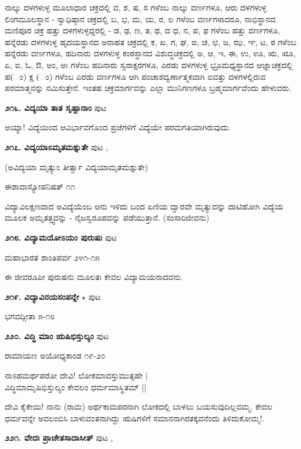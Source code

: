 ನಾಲ್ಕು ದಳಗಳುಳ್ಳ ಮೂಲಾಧಾರ ಚಕ್ರದಲ್ಲಿ ವ, ಶ, ಷ, ಸ ಗಳೆಂಬ ನಾಲ್ಕು ವರ್ಣಗಳೂ,  ಆರು ದಳಗಳುಳ್ಳ ಲಿಂಗಮೂಲಸ್ಥಾನ - ಸ್ವಾಧಿಷ್ಠಾನ ಚಕ್ರದಲ್ಲಿ ಬ, ಭ, ಮ, ಯ, ರ, ಲ ಗಳೆಂಬ ವರ್ಣಗಳಾದರೂ, ನಾಭಿಸ್ಥಾನದ ಮಣಿಪೂರ ಚಕ್ರ ಹತ್ತು ದಳಗಳುಳ್ಳದ್ದರಲ್ಲಿ - ಡ, ಢ, ಣ, ತ, ಥ, ದ ಧ, ನ, ಪ, ಫ ಗಳೆಂಬ ಹತ್ತು ವರ್ಣಗಳೂ, ಹನ್ನೆರಡು ದಳಗಳುಳ್ಳ ಹೃದಯಸ್ಥಾನದ ಅನಾಹತ ಚಕ್ರದಲ್ಲಿ ಕ, ಖ, ಗ, ಘ, ಙ, ಚ, ಛ, ಜ, ಝ, ಞ, ಟ, ಠ ಗಳೆಂಬ ಹನ್ನೆರಡು ವರ್ಣಗಳೂ, ಹದಿನಾರು ದಳಗಳುಳ್ಳ ಕಂಠಸ್ಥಾನದ ವಿಶುದ್ಧಚಕ್ರದಲ್ಲಿ ಅ, ಆ, ಇ, ಈ, ಉ, ಊ, ಋ, ೠ, ಏ, ಐ, ಓ, ಔ, ಅಂ, ಅಃ ಗಳೆಂಬ ಹದಿನಾರು ಸ್ವರಾಕ್ಷರಗಳೂ, ಎರಡು ದಳಗಳುಳ್ಳ ಭ್ರೂಮಧ್ಯಸ್ಥಾನದ ಆಜ್ಞಾಚಕ್ರದಲ್ಲಿ ಹ(ಂ) ಕ್ಷ (ಂ) ಗಳೆಂಬ ಎರಡು ವರ್ಣಗಳೂ ಆಗಿ ಪಂಚಾಶದ್ವರ್ಣಾತ್ಮಕವಾಗಿ ಐವತ್ತು ದಳಗಳಲ್ಲಿರುವ ಪರಮಾತ್ಮನನ್ನು ನಮಿಸುತ್ತೇನೆ. ಇಂತಹ ಚಕ್ರಮಾರ್ಗವನ್ನು ಎಲ್ಲಾ ಮುನಿಗಣಗಳೂ ಬ್ರಹ್ಮಮಾರ್ಗವೆಂದು ಹೇಳುವರು.

\medskip
\noindent\textbf{೨೧೬. ವಿದ್ಯಯಾ ತಾತ ಸೃಷ್ಟಾನಾಂ} \hfill ಪುಟ \pageref{133}

ಅಯ್ಯಾ! ವಿದ್ಯೆಯಿಂದ ಆವಿರ್ಭಾವಗೊಂದ ಪ್ರಜೆಗಳಿಗೆ ವಿದ್ಯೆಯೇ ಪರಮಗತಿಯಾಗಿರುವುದು.

\medskip
\noindent\textbf{೨೧೭. ವಿದ್ಯಯಾಽಮೃತಮಶ್ನುತೇ} \hfill ಪುಟ \pageref{99},\pageref{133a}

(ಅವಿದ್ಯಯಾ ಮೃತ್ಯುಂ ತೀರ್ತ್ವಾ ವಿದ್ಯಯಾಮೃತಮಶ್ನುತೇ)

\hfill ಈಶಾವಾಸ್ಯೋಪನಿಷತ್ ೧೧

ವಿದ್ಯಾವಿಲಕ್ಷಣವಾದ ಅವಿದ್ಯೆಯೆಂಬ ಆನು ಇಳಿದು ಬಂದ ಏಣಿಯ ದ್ವಾರವೇ ಮೃತ್ಯುವನ್ನು ದಾಟಿಹೋಗಿ ವಿದ್ಯೆಯ ಮೂಲಕ ಅಮೃತತ್ತ್ವವನ್ನು - ನೈಜಸ್ವರೂಪವನ್ನು ಪಡೆಯುತ್ತಾನೆ. (ಸಂಸಾರಿಜೀವನು)

\medskip
\noindent\textbf{೨೧೮. ವಿದ್ಯಾಮಯೋಽಯಂ ಪುರುಷಃ} \hfill ಪುಟ \pageref{133b}

\hfill ಮಹಾಭಾರತ ಶಾಂತಿಪರ್ವ ೨೪೧-೧೫

ಈ ಜೀವರೂಪೀ ಪುರುಷನು ಮೂಲತಃ ಕೇವಲ ವಿದ್ಯಾಮಯನಾದವನು.

\medskip
\noindent\textbf{೨೧೯. ವಿದ್ಯಾವಿನಯಸಂಪನ್ನೇ} $\star$ \hfill ಪುಟ \pageref{67}

\hfill ಭಗವದ್ಗೀತಾ ೫-೧೮

\medskip
\noindent\textbf{೨೨೦. ವಿದ್ಧಿ ಮಾಂ ಋಷಿಭಿಸ್ತುಲ್ಯಂ} \hfill ಪುಟ \pageref{151b}

\hfill ರಾಮಾಯಣ ಅಯೋಧ್ಯಕಾಂಡ ೧೯-೨೦

\begin{shloka}
ನಾಽಹಮರ್ಥಪರೋ ದೇವಿ! ಲೋಕಮಾವಸ್ತುಮುತ್ಸಹೇ |\\
ವಿದ್ಧಿಮಾಮೃಷಿಭಿಸ್ತುಲ್ಯಂ ಕೇವಲಂ ಧರ್ಮಮಾಸ್ಥಿತಮ್ ||
\end{shloka}

ದೇವಿ ಕೈಕೇಯಿ! ನಾನು (ರಾಮ) ಅರ್ಥಕಾಮಪರನಾಗಿ ಲೋಕದಲ್ಲಿ ಬಾಳಲು ಬಯಸುವುದಿಲ್ಲವಮ್ಮ. ಕೇವಲ ಧರ್ಮವನ್ನೇ ಅವಲಂಬಿಸಿ ಬಾಳುವಂತನಾಗಿದ್ದು ಋಷಿಗಳಿಗೆ ಸಮಾನನಾಗಿರತಕ್ಕವನೆಂದು ತಿಳಿದುಕೋಮ್ಮ!.

\medskip
\noindent\textbf{೨೨೧. ವೇದಃ ಪ್ರಾಚೇತಸಾದಾಸೀತ್} \hfill ಪುಟ \pageref{228},\pageref{232c}

